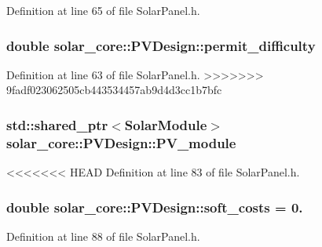 Definition at line 65 of file Solar\+Panel.\+h.

\hypertarget{classsolar__core_1_1_p_v_design_a8c2897033c697a6dcfb96787358dc64f}{}
\subsubsection[{permit\+\_\+difficulty}]{\setlength{\rightskip}{0pt plus 5cm}double solar\+\_\+core\+::\+P\+V\+Design\+::permit\+\_\+difficulty}\label{classsolar__core_1_1_p_v_design_a8c2897033c697a6dcfb96787358dc64f}


Definition at line 63 of file Solar\+Panel.\+h.
>>>>>>> 9fadf023062505cb443534457ab9d4d3cc1b7bfc

\hypertarget{classsolar__core_1_1_p_v_design_a89f2b59847de64cab26b56f21ace4e6c}{}
\subsubsection[{P\+V\+\_\+module}]{\setlength{\rightskip}{0pt plus 5cm}std\+::shared\+\_\+ptr$<${\bf Solar\+Module}$>$ solar\+\_\+core\+::\+P\+V\+Design\+::\+P\+V\+\_\+module}\label{classsolar__core_1_1_p_v_design_a89f2b59847de64cab26b56f21ace4e6c}


<<<<<<< HEAD
Definition at line 83 of file Solar\+Panel.\+h.

\hypertarget{classsolar__core_1_1_p_v_design_ac1220011d65d7cc442cd143f93123f31}{}
\subsubsection[{soft\+\_\+costs}]{\setlength{\rightskip}{0pt plus 5cm}double solar\+\_\+core\+::\+P\+V\+Design\+::soft\+\_\+costs = 0.}\label{classsolar__core_1_1_p_v_design_ac1220011d65d7cc442cd143f93123f31}


Definition at line 88 of file Solar\+Panel.\+h.

